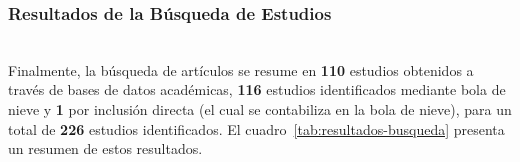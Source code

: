 \subsubsection{Resultados de la Búsqueda de Estudios}\label{subsubsec:resultados-busqueda}
\mbox{}\\
Finalmente, la búsqueda de artículos se resume en \textbf{110} estudios obtenidos a través de bases de datos académicas, \textbf{116} estudios identificados mediante bola de nieve y \textbf{1} por inclusión directa (el cual se contabiliza en la bola de nieve), para un total de \textbf{226} estudios identificados. El cuadro~\ref{tab:resultados-busqueda} presenta un resumen de estos resultados.
\mbox{}\\